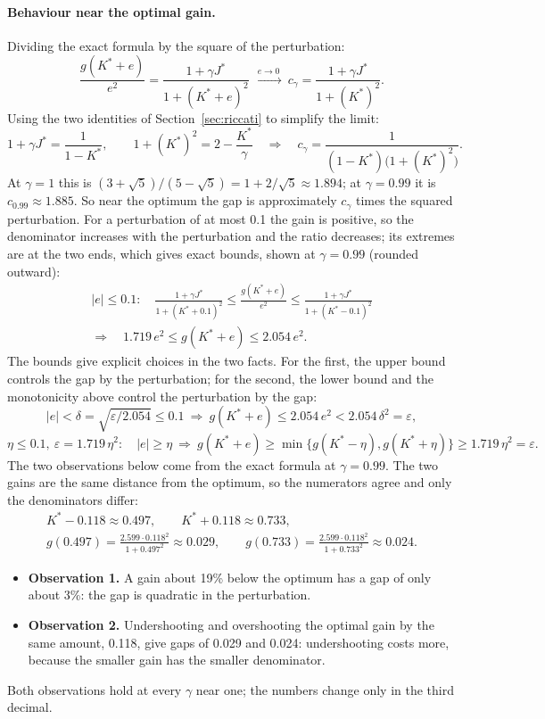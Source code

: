 \documentclass[11pt]{article}
\begin{document}
\paragraph{Behaviour near the optimal gain.} Dividing the exact formula by the square of the
perturbation:
\[
  \frac{g(K^* + e)}{e^2} = \frac{1 + \gamma J^*}{1 + (K^* + e)^2}
  \ \xrightarrow{\ e \to 0\ }\ c_\gamma = \frac{1 + \gamma J^*}{1 + (K^*)^2} .
\]
Using the two identities of Section~\ref{sec:riccati} to simplify the limit:
\[
  1 + \gamma J^* = \frac{1}{1 - K^*}, \qquad 1 + (K^*)^2 = 2 - \frac{K^*}{\gamma}
  \quad\Longrightarrow\quad
  c_\gamma = \frac{1}{(1 - K^*)\big(1 + (K^*)^2\big)} .
\]
At $\gamma = 1$ this is $(3 + \sqrt{5})/(5 - \sqrt{5}) = 1 + 2/\sqrt{5} \approx 1.894$; at
$\gamma = 0.99$ it is $c_{0.99} \approx 1.885$. So near the optimum the gap is approximately $c_\gamma$
times the squared perturbation. For a perturbation of at most 0.1 the gain is positive, so the
denominator increases with the perturbation and the ratio decreases; its extremes are at the two ends,
which gives exact bounds, shown at $\gamma = 0.99$ (rounded outward):
\begin{gather*}
  |e| \le 0.1: \quad \frac{1 + \gamma J^*}{1 + (K^* + 0.1)^2} \le \frac{g(K^* + e)}{e^2}
  \le \frac{1 + \gamma J^*}{1 + (K^* - 0.1)^2} \\
  \Longrightarrow\quad 1.719\, e^2 \le g(K^* + e) \le 2.054\, e^2 .
\end{gather*}
The bounds give explicit choices in the two facts. For the first, the upper bound controls the gap
by the perturbation; for the second, the lower bound and the monotonicity above control the
perturbation by the gap:
\[
  |e| < \delta = \sqrt{\varepsilon / 2.054} \le 0.1
  \ \Longrightarrow\ g(K^* + e) \le 2.054\, e^2 < 2.054\, \delta^2 = \varepsilon ,
\]
\[
  \eta \le 0.1, \ \varepsilon = 1.719\, \eta^2: \quad
  |e| \ge \eta \ \Longrightarrow\ g(K^* + e) \ge \min\big\{ g(K^* - \eta), g(K^* + \eta) \big\}
  \ge 1.719\, \eta^2 = \varepsilon .
\]
The two observations below come from the exact formula at $\gamma = 0.99$. The two gains are the same
distance from the optimum, so the numerators agree and only the denominators differ:
\begin{gather*}
  K^* - 0.118 \approx 0.497, \qquad K^* + 0.118 \approx 0.733, \\
  g(0.497) = \frac{2.599 \cdot 0.118^2}{1 + 0.497^2} \approx 0.029, \qquad
  g(0.733) = \frac{2.599 \cdot 0.118^2}{1 + 0.733^2} \approx 0.024 .
\end{gather*}
\begin{itemize}[leftmargin=*]
  \item \textbf{Observation 1.} A gain about 19\% below the optimum has a gap of only about 3\%: the
    gap is quadratic in the perturbation.
  \item \textbf{Observation 2.} Undershooting and overshooting the optimal gain by the same amount,
    0.118, give gaps of 0.029 and 0.024: undershooting costs more, because the smaller gain has the
    smaller denominator.
\end{itemize}
Both observations hold at every $\gamma$ near one; the numbers change only in the third decimal.
\end{document}
